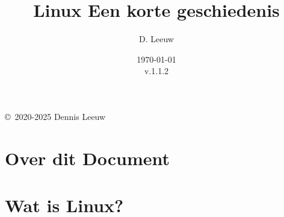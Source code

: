 \documentclass[a4paper,12pt,twoside,openright,titlepage]{book}
\author{D. Leeuw}
\title{Linux Een korte geschiedenis}
\date{\today\\v.1.1.2}
\begin{document}

\maketitle

\copyright\ 2020-2025 Dennis Leeuw\\




\frontmatter
\chapter{Over dit Document}
%
%

\tableofcontents

\mainmatter

\chapter{Wat is Linux?}


\backmatter
\printindex
\end{document}
